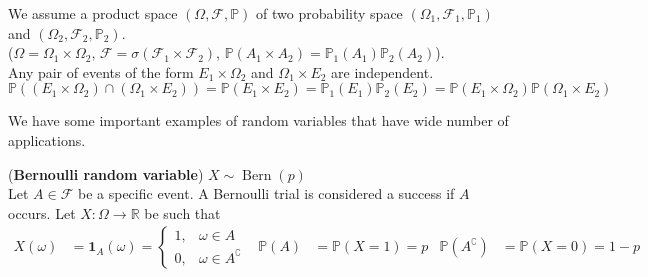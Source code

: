 \documentclass{huhtakm-template-book}
\newcommand{\prob}{\mathbb{P}}
\DeclareMathOperator{\Bern}{Bern}
\begin{document}
    \begin{rem}
        We assume a product space $(\Omega,\mathcal{F},\prob)$ of two probability space $(\Omega_{1},\mathcal{F}_{1},\prob_{1})$ and $(\Omega_{2},\mathcal{F}_{2},\prob_{2})$.\\
        ($\Omega=\Omega_{1}\times\Omega_{2}$, $\mathcal{F}=\sigma(\mathcal{F}_{1}\times\mathcal{F}_{2})$, $\prob(A_{1}\times A_{2})=\prob_{1}(A_{1})\prob_{2}(A_{2})$).\\
        Any pair of events of the form $E_{1}\times\Omega_{2}$ and $\Omega_{1}\times E_{2}$ are independent.
        \begin{equation*}
            \prob((E_{1}\times\Omega_{2})\cap(\Omega_{1}\times E_{2}))=\prob(E_{1}\times E_{2})=\prob_{1}(E_{1})\prob_{2}(E_{2})=\prob(E_{1}\times\Omega_{2})\prob(\Omega_{1}\times E_{2})
        \end{equation*}
    \end{rem}
    We have some important examples of random variables that have wide number of applications.
    \begin{eg}(\textbf{Bernoulli random variable}) $X\sim \Bern(p)$\\
        Let $A\in\mathcal{F}$ be a specific event. A Bernoulli trial is considered a success if $A$ occurs. Let $X:\Omega\to\mathbb{R}$ be such that
        \begin{align*}
            X(\omega)&=\mathbf{1}_{A}(\omega)=\begin{cases}
                1, &\omega\in A\\
                0, &\omega\in A^{\complement}
            \end{cases} & \prob(A)&=\prob(X=1)=p & \prob(A^{\complement})&=\prob(X=0)=1-p
        \end{align*}
    \end{eg}
\end{document}
